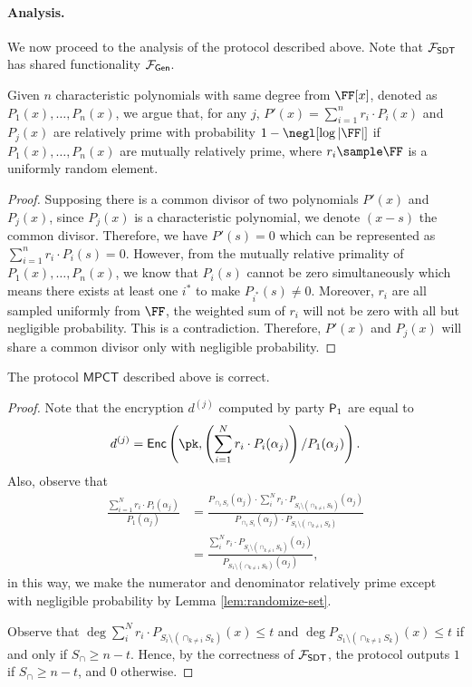 \paragraph{Analysis.} We now proceed to the analysis of the protocol described above. Note that $\mathcal{F}_\mathsf{SDT}$ has shared functionality $\mathcal{F}_\mathsf{Gen}$.
\begin{lemma}\label{lem:randomize-set}
Given $n$ characteristic polynomials with same degree from $\FF[x]$, denoted as $P_1(x),\dots,P_n(x)$,
we argue that, for any $j$, $P'(x)=\sum_{i=1}^n r_i\cdot P_i(x)$ and $P_j(x)$ are relatively prime with probability $1-\negl[\log|\FF|]$ if $P_1(x),\dots,P_n(x)$ are mutually relatively prime, where $r_i\sample \FF$ is a uniformly random element.
\end{lemma}
\begin{proof}
Supposing there is a common divisor of two polynomials $P'(x)$ and $P_j(x)$, since $P_j(x)$ is a characteristic polynomial, we denote $(x-s)$ the common divisor. Therefore, we have $P'(s)=0$ which can be represented as $\sum_{i=1}^n r_i\cdot P_i(s) = 0$. However, from the mutually relative primality of $P_1(x),\dots,P_n(x)$, we know that $P_i(s)$ cannot be zero simultaneously which means there exists at least one $i^*$ to make $P_{i^*}(s)\neq 0$. Moreover, $r_i$ are all sampled uniformly from $\FF$, the weighted sum of $r_i$ will not be zero with all but negligible probability. This is a contradiction. Therefore, $P'(x)$ and $P_j(x)$ will share a common divisor only with negligible probability.
\end{proof}

\begin{theorem}[Correctness]
The protocol $\mathsf{MPCT}$ described above is correct.
\end{theorem}{}
\begin{proof}
Note that the encryption $d^{(j)}$ computed by party $\mathsf{P}_1$ are equal to $$d^{(j)}=\mathsf{Enc}\left(\pk,\left(\sum_{i=1}^N r_i\cdot P_i(\alpha_j)\right)/P_1(\alpha_j)\right).$$ 
Also, observe that 
\begin{align*}
\frac{\sum_{i=1}^N r_i\cdot P_i(\alpha_j)}{P_1(\alpha_j)}
& =\frac{P_{\cap_i S_i}(\alpha_j)\cdot\sum_i^{N} r_i\cdot P_{S_i\setminus \left(\cap_{k\neq i} S_k\right)}(\alpha_j)}{P_{\cap_i S_i}(\alpha_j)\cdot P_{S_1\setminus \left(\cap_{k\neq 1} S_k\right)}} \\ 
& =\frac{\sum_i^{N} r_i\cdot P_{S_i\setminus \left(\cap_{k\neq i} S_k\right)}(\alpha_j)}{ P_{S_1\setminus \left(\cap_{k\neq 1} S_k\right)}(\alpha_j)},
\end{align*}{} 
in this way, we make the numerator and denominator relatively prime except with negligible probability by Lemma \ref{lem:randomize-set}.

Observe that $\deg \sum_i^{N} r_i\cdot P_{S_i\setminus \left(\cap_{k\neq i} S_k\right)}(x) \leq t$  and $\deg P_{S_1\setminus \left(\cap_{k\neq 1} S_k\right)}(x)\leq t$ if and only if $S_\cap\geq n-t$. Hence, by the correctness of $\mathcal{F}_{\mathsf{SDT}}$, the protocol outputs $1$ if $S_\cap\geq n-t$, and $0$ otherwise.
\end{proof}{}



